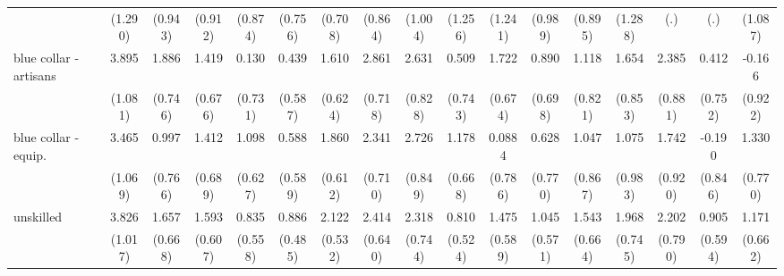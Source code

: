 {\begin{tabular}{l*{16}{c}}
                    &     (1.290)         &     (0.943)         &     (0.912)         &     (0.874)         &     (0.756)         &     (0.708)         &     (0.864)         &     (1.004)         &     (1.256)         &     (1.241)         &     (0.989)         &     (0.895)         &     (1.288)         &         (.)         &         (.)         &     (1.087)         \\
[1em]
blue collar - artisans&       3.895\sym{***}&       1.886\sym{*}  &       1.419\sym{*}  &       0.130         &       0.439         &       1.610\sym{**} &       2.861\sym{***}&       2.631\sym{**} &       0.509         &       1.722\sym{*}  &       0.890         &       1.118         &       1.654         &       2.385\sym{**} &       0.412         &      -0.166         \\
                    &     (1.081)         &     (0.746)         &     (0.676)         &     (0.731)         &     (0.587)         &     (0.624)         &     (0.718)         &     (0.828)         &     (0.743)         &     (0.674)         &     (0.698)         &     (0.821)         &     (0.853)         &     (0.881)         &     (0.752)         &     (0.922)         \\
[1em]
blue collar - equip.&       3.465\sym{**} &       0.997         &       1.412\sym{*}  &       1.098         &       0.588         &       1.860\sym{**} &       2.341\sym{***}&       2.726\sym{**} &       1.178         &      0.0884         &       0.628         &       1.047         &       1.075         &       1.742         &      -0.190         &       1.330         \\
                    &     (1.069)         &     (0.766)         &     (0.689)         &     (0.627)         &     (0.589)         &     (0.612)         &     (0.710)         &     (0.849)         &     (0.668)         &     (0.786)         &     (0.770)         &     (0.867)         &     (0.983)         &     (0.920)         &     (0.846)         &     (0.770)         \\
[1em]
unskilled           &       3.826\sym{***}&       1.657\sym{*}  &       1.593\sym{**} &       0.835         &       0.886         &       2.122\sym{***}&       2.414\sym{***}&       2.318\sym{**} &       0.810         &       1.475\sym{*}  &       1.045         &       1.543\sym{*}  &       1.968\sym{**} &       2.202\sym{**} &       0.905         &       1.171         \\
                    &     (1.017)         &     (0.668)         &     (0.607)         &     (0.558)         &     (0.485)         &     (0.532)         &     (0.640)         &     (0.744)         &     (0.524)         &     (0.589)         &     (0.571)         &     (0.664)         &     (0.745)         &     (0.790)         &     (0.594)         &     (0.662)         \\

\end{tabular}}
